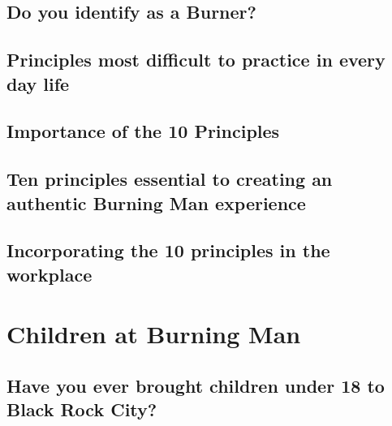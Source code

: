 \documentclass[
]{book}
\begin{document}
\hypertarget{do-you-identify-as-a-burner}{%
\subsection{Do you identify as a Burner?}\label{do-you-identify-as-a-burner}}

\hypertarget{principles-most-difficult-to-practice-in-every-day-life}{%
\subsection{Principles most difficult to practice in every day life}\label{principles-most-difficult-to-practice-in-every-day-life}}

\hypertarget{importance-of-the-10-principles}{%
\subsection{Importance of the 10 Principles}\label{importance-of-the-10-principles}}

\hypertarget{ten-principles-essential-to-creating-an-authentic-burning-man-experience}{%
\subsection{Ten principles essential to creating an authentic Burning Man experience}\label{ten-principles-essential-to-creating-an-authentic-burning-man-experience}}

\hypertarget{incorporating-the-10-principles-in-the-workplace}{%
\subsection{Incorporating the 10 principles in the workplace}\label{incorporating-the-10-principles-in-the-workplace}}

\hypertarget{children-at-burning-man}{%
\section{Children at Burning Man}\label{children-at-burning-man}}

\hypertarget{have-you-ever-brought-children-under-18-to-black-rock-city}{%
\subsection{Have you ever brought children under 18 to Black Rock City?}\label{have-you-ever-brought-children-under-18-to-black-rock-city}}
\end{document}

